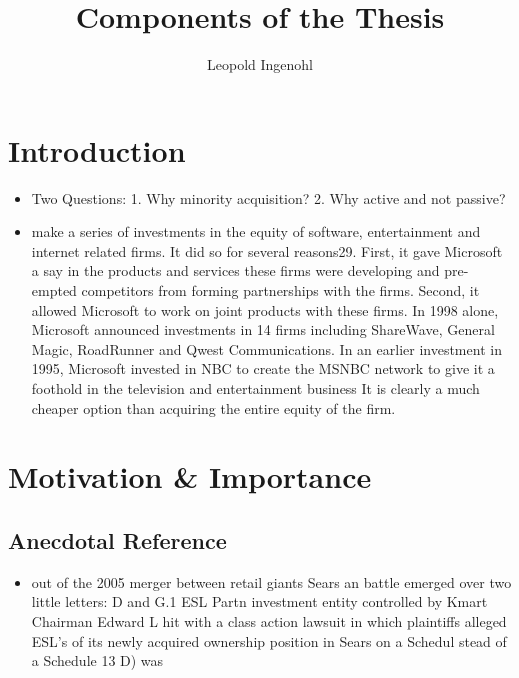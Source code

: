 \documentclass[12pt]{article}
\title{Components of the Thesis}
\author{Leopold Ingenohl}
\begin{document}
\maketitle

\pagebreak

\tableofcontents

\pagebreak

\section{Introduction}

\begin{itemize}
    \item Two Questions: 1. Why minority acquisition? 2. Why active and not passive? 
    \item make a series of investments in the equity of software, entertainment and internet related firms. It did so for several reasons29. First, it gave Microsoft a say in the products and services these firms were developing and pre-empted competitors from forming partnerships with the firms. Second, it allowed Microsoft to work on joint products with these firms. In 1998 alone, Microsoft announced investments in 14 firms including ShareWave, General Magic, RoadRunner and Qwest Communications. In an earlier investment in 1995, Microsoft invested in NBC to create the MSNBC network to give it a foothold in the television and entertainment business \citep{Damodaran2005} It is clearly a much cheaper option than acquiring the entire equity of the firm. 
\end{itemize}

\section{Motivation \& Importance} 


\subsection{Anecdotal Reference}

    \begin{itemize}
        
        \item out of the 2005 merger between retail giants Sears an battle emerged over two little letters: D and G.1 ESL Partn investment entity controlled by Kmart Chairman Edward L hit with a class action lawsuit in which plaintiffs alleged ESL's of its newly acquired ownership position in Sears on a Schedul stead of a Schedule 13 D) was \citep{Giglia2018}

        

    \end{itemize}
\end{document}
